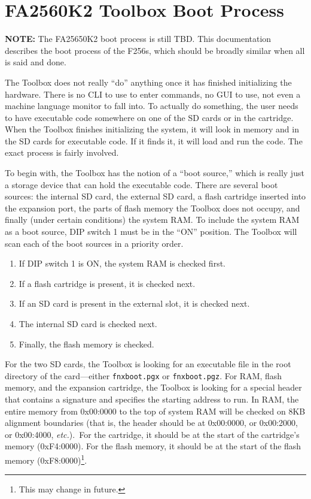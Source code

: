 \chapter{FA2560K2 Toolbox Boot Process}

\begin{tcolorbox}
	{\bf NOTE:} The FA25650K2 boot process is still TBD. This documentation describes the boot process of the F256s, which should be broadly similar when all is said and done.
\end{tcolorbox}

The Toolbox does not really ``do'' anything once it has finished initializing the hardware. There is no CLI to use to enter commands, no GUI to use, not even a machine language monitor to fall into. To actually do something, the user needs to have executable code somewhere on one of the SD cards or in the cartridge. When the Toolbox finishes initializing the system, it will look in memory and in the SD cards for executable code. If it finds it, it will load and run the code. The exact process is fairly involved.

To begin with, the Toolbox has the notion of a ``boot source,'' which is really just a storage device that can hold the executable code. There are several boot sources: the internal SD card, the external SD card, a flash cartridge inserted into the expansion port, the parts of flash memory the Toolbox does not occupy, and finally (under certain conditions) the system RAM. To include the system RAM as a boot source, DIP switch 1 must be in the ``ON'' position. The Toolbox will scan each of the boot sources in a priority order.

\begin{enumerate}
	\item If DIP switch 1 is ON, the system RAM is checked first.
	\item If a flash cartridge is present, it is checked next.
	\item If an SD card is present in the external slot, it is checked next.
	\item The internal SD card is checked next.
	\item Finally, the flash memory is checked.
\end{enumerate}

For the two SD cards, the Toolbox is looking for an executable file in the root directory of the card---either \verb+fnxboot.pgx+ or \verb+fnxboot.pgz+. For RAM, flash memory, and the expansion cartridge, the Toolbox is looking for a special header that contains a signature and specifies the starting address to run. In RAM, the entire memory from 0x00:0000 to the top of system RAM will be checked on 8KB alignment boundaries (that is, the header should be at 0x00:0000, or 0x00:2000, or 0x00:4000, {\it etc.}).\ For the cartridge, it should be at the start of the cartridge's memory (0xF4:0000). For the flash memory, it should be at the start of the flash memory (0xF8:0000)\footnote{This may change in future.}.

